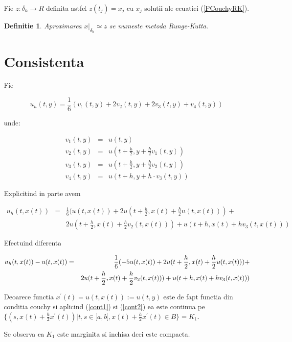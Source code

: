 \documentclass[a4paper,twoside]{book}
\newtheorem{definition}[theorem]{Definitie}
\begin{document}
Fie $z:\delta _{h}\rightarrow R$ definita astfel $z(t_{j})=x_{j}$ cu $x_{j}$
solutii ale ecuatiei (\ref{PCouchyRK}).

\begin{definition}
Aproximarea $x|_{\delta _{h}}\simeq z$ se numeste metoda Runge-Kutta.
\end{definition}

\section{Consistenta}

Fie

\begin{equation*}
u_{h}(t,y)=\frac{1}{6}(v_{1}(t,y)+2v_{2}(t,y)+2v_{3}(t,y)+v_{4}(t,y))\,
\end{equation*}

unde:

\begin{eqnarray*}
v_{1}(t,y) &=&u(t,y) \\
v_{2}(t,y) &=&u(t+\frac{h}{2},y+\frac{h}{2}v_{1}(t,y)) \\
v_{3}(t,y) &=&u(t+\frac{h}{2},y+\frac{h}{2}v_{2}(t,y)) \\
v_{4}(t,y) &=&u(t+h,y+h\cdot v_{3}(t,y))
\end{eqnarray*}

Explicitind in parte avem

\begin{eqnarray*}
u_{h}(t,x(t)) &=&\frac{1}{6}(u(t,x(t))+2u(t+\frac{h}{2},x(t)+\frac{h}{2}%
u(t,x(t)))+ \\
&&2u(t+\frac{h}{2},x(t)+\frac{h}{2}v_{2}(t,x(t)))+u(t+h,x(t)+hv_{3}(t,x(t)))
\end{eqnarray*}

Efectuind diferenta

\begin{eqnarray}
u_{h}(t,x(t))-u(t,x(t)) &=&\frac{1}{6}(-5u(t,x(t))+2u(t+\frac{h}{2},x(t)+%
\frac{h}{2}u(t,x(t)))+  \label{RK5} \\
&&2u(t+\frac{h}{2},x(t)+\frac{h}{2}v_{2}(t,x(t)))+u(t+h,x(t)+hv_{3}(t,x(t)))
\notag
\end{eqnarray}

Deoarece functia $x^{\prime }(t)=u(t,x(t)):=u(t,y)$ este de fapt functia din
conditia couchy si aplicind (\ref{cont1}) si (\ref{cont2}) ea este continua
pe $\{(s,x(t)+\frac{h}{2}x^{\prime }(t))|t,s\in \lbrack a,b],x(t)+\frac{h}{2}%
x^{\prime }(t)\in B\}=K_{1}$.

Se observa ca $K_{1}$ este marginita si inchisa deci este compacta.
\end{document}
